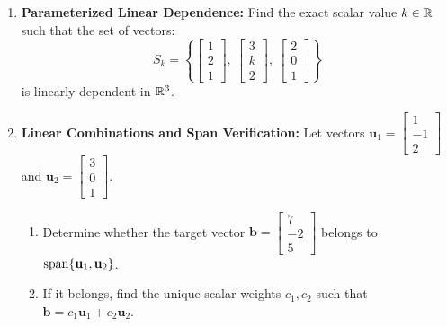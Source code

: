 \begin{enumerate}
    \item \textbf{Parameterized Linear Dependence:}
    Find the exact scalar value $k \in \mathbb{R}$ such that the set of vectors:
    \begin{equation}
    S_k = \left\{ \begin{bmatrix} 1 \\ 2 \\ 1 \end{bmatrix}, \ \begin{bmatrix} 3 \\ k \\ 2 \end{bmatrix}, \ \begin{bmatrix} 2 \\ 0 \\ 1 \end{bmatrix} \right\}
    \end{equation}
    is linearly dependent in $\mathbb{R}^3$.

    \item \textbf{Linear Combinations and Span Verification:}
    Let vectors $\mathbf{u}_1 = \begin{bmatrix} 1 \\ -1 \\ 2 \end{bmatrix}$ and $\mathbf{u}_2 = \begin{bmatrix} 3 \\ 0 \\ 1 \end{bmatrix}$.
    \begin{enumerate}
        \item Determine whether the target vector $\mathbf{b} = \begin{bmatrix} 7 \\ -2 \\ 5 \end{bmatrix}$ belongs to $\operatorname{span}\{\mathbf{u}_1, \mathbf{u}_2\}$.
        \item If it belongs, find the unique scalar weights $c_1, c_2$ such that $\mathbf{b} = c_1 \mathbf{u}_1 + c_2 \mathbf{u}_2$.
    \end{enumerate}


\end{enumerate}
